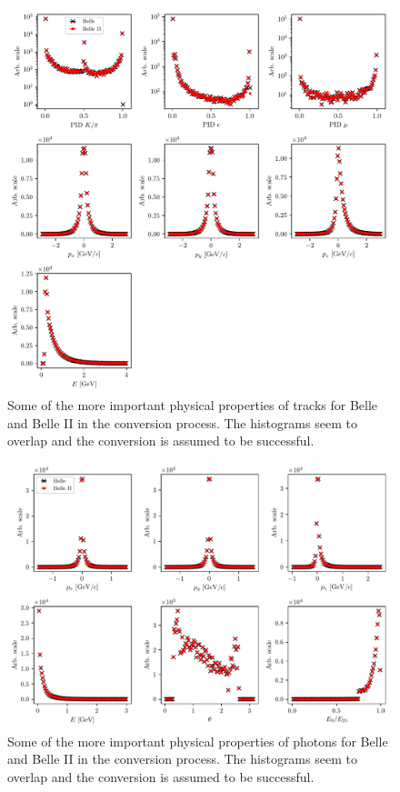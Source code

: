 \begin{figure}[H]
\centering
\captionsetup{width=0.8\linewidth}
\includegraphics[width=\linewidth]{fig/b2bii_tracks}
\caption{Some of the more important physical properties of tracks for Belle and Belle II in the conversion process. The histograms seem to overlap and the conversion is assumed to be successful.}
\label{fig:b2bii_tracks}
\end{figure}

\begin{figure}[H]
\centering
\captionsetup{width=0.8\linewidth}
\includegraphics[width=\linewidth]{fig/b2bii_gammas}
\caption{Some of the more important physical properties of photons for Belle and Belle II in the conversion process. The histograms seem to overlap and the conversion is assumed to be successful.}
\label{fig:b2bii_gammas}
\end{figure}

